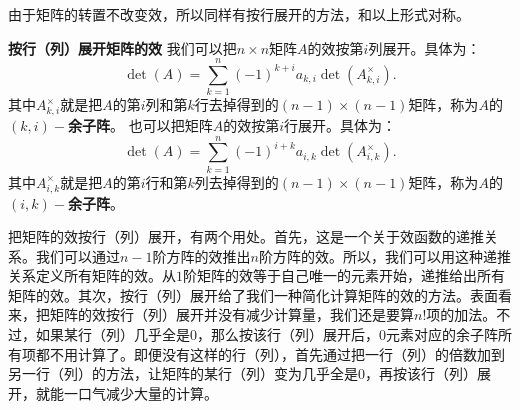 \documentclass[12pt,UTF8]{ctexbook}
\begin{document}
由于矩阵的转置不改变效，所以同样有按行展开的方法，和以上形式对称。

\begin{tm}{\textbf{按行（列）展开矩阵的效}}
    我们可以把$n\times n$矩阵$A$的效按第$i$列展开。具体为：
    $$
    \det(A) = \sum_{k=1}^n (-1)^{k+i} a_{k,i} \det(A_{k,i}^{\times}).
    $$
    其中$A_{k,i}^{\times}$就是把$A$的第$i$列和第$k$行去掉得到的$(n-1)\times (n-1)$矩阵，称为$A$的$(k,i)-$\textbf{余子阵}。
    也可以把矩阵$A$的效按第$i$行展开。具体为：
    $$
    \det(A) = \sum_{k=1}^n (-1)^{i+k} a_{i,k} \det(A_{i,k}^{\times}).
    $$
    其中$A_{i,k}^{\times}$就是把$A$的第$i$行和第$k$列去掉得到的$(n-1)\times (n-1)$矩阵，称为$A$的$(i,k)-$\textbf{余子阵}。
\end{tm}

把矩阵的效按行（列）展开，有两个用处。首先，这是一个关于效函数的递推关系。我们可以通过$n-1$阶方阵的效推出$n$阶方阵的效。所以，我们可以用这种递推关系定义所有矩阵的效。从$1$阶矩阵的效等于自己唯一的元素开始，递推给出所有矩阵的效。其次，按行（列）展开给了我们一种简化计算矩阵的效的方法。表面看来，把矩阵的效按行（列）展开并没有减少计算量，我们还是要算$n!$项的加法。不过，如果某行（列）几乎全是$0$，那么按该行（列）展开后，$0$元素对应的余子阵所有项都不用计算了。即便没有这样的行（列），首先通过把一行（列）的倍数加到另一行（列）的方法，让矩阵的某行（列）变为几乎全是$0$，再按该行（列）展开，就能一口气减少大量的计算。
\end{document}
